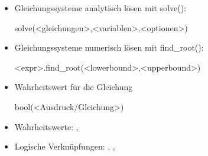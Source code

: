 \documentclass[a4paper,9pt,DIV15,twocolumn]{scrartcl}
\begin{document}
\begin{itemize}
 \item Gleichungssysteme analytisch lösen mit solve():
\begin{sagein}
 solve(<gleichungen>,<variablen>,<optionen>)
\end{sagein}
\item Gleichungssysteme numerisch lösen mit find\_root():
    \begin{sagein}
<expr>.find_root(<lowerbound>,<upperbound>)
    \end{sagein}

 \item Wahrheitswert für die Gleichung
     \begin{sagein}
bool(<Ausdruck/Gleichung>)   
     \end{sagein}
 \item Wahrheitswerte: , 
 \item Logische Verknüpfungen: , , 
\end{itemize}
\end{document}
